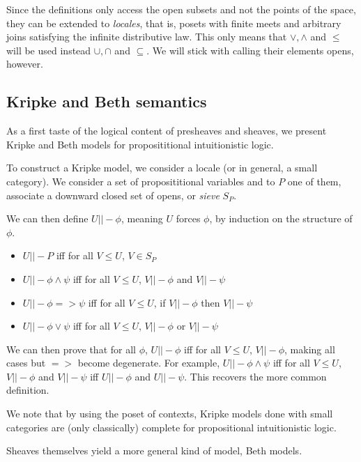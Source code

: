 \documentclass[11pt]{article}
\newcommand{\0}{\mathbf{0}}
\newcommand{\1}{\mathbf{1}}
\begin{document}
Since the definitions only access the open subsets and not the points of the space, they can be extended to \emph{locales}, that is, posets with finite meets and arbitrary joins satisfying the infinite distributive law.
This only means that $\vee,\wedge$ and $\leq$ will be used instead $\cup,\cap$ and $\subseteq$.
We will stick with calling their elements opens, however.

\subsection{Kripke and Beth semantics}\label{KripkeBeth}
As a first taste of the logical content of presheaves and sheaves, we present Kripke and Beth models for proposititional intuitionistic logic.


To construct a Kripke model, we consider a locale (or in general, a small category). We consider a set of proposititional variables and to $P$ one of them, associate a downward closed set of opens, or \emph{sieve} $S_P$.

We can then define $U ||- \phi$, meaning $U$ forces $\phi$, by induction on the structure of $\phi$.
\begin{itemize}
    \item $U ||- P$ iff for all $V\leq U$, $V \in S_P$
    \item $U ||- \phi \wedge \psi$ iff for all $V\leq U$, $V ||- \phi$ and $V ||- \psi$
    \item $U ||- \phi => \psi$ iff for all $V \leq U$, if $V ||- \phi$ then $V ||- \psi $
    \item $U ||- \phi \vee \psi $ iff for all $V \leq U$, $V ||- \phi$ or $V ||- \psi$
\end{itemize}

We can then prove that for all $\phi$, $U||-\phi$ iff for all $V \leq U$, $V ||- \phi$, making all cases but $ => $ become degenerate. For example, $U ||- \phi \wedge \psi$ iff for all $V \leq U$, $ V||- \phi$ and $V ||- \psi$ iff $U||- \phi$ and $U||- \psi$. This recovers the more common definition.

We note that by using the poset of contexts, Kripke models done with small categories are (only classically) complete for propositional intuitionistic logic.

Sheaves themselves yield a more general kind of model, Beth models.
\end{document}
